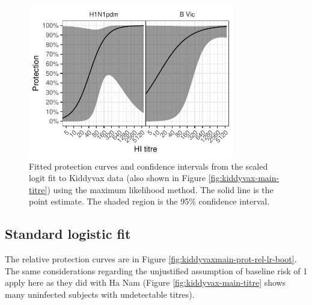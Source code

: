 \documentclass[12pt]{article}
\begin{document}
\begin{figure}[htp]
	\centering
	\includegraphics[width=0.8\textwidth]{../fit-sclr-plot/kiddyvaxmain-prot.pdf}
	\caption{
	Fitted protection curves and confidence intervals from the scaled logit fit to Kiddyvax data (also shown in Figure \ref{fig:kiddyvax-main-titre}) using the maximum likelihood method. The solid line is the point estimate. The shaded region is the 95\% confidence interval.
	}
	\label{fig:kiddyvaxmain-sclr-prot}
\end{figure}

%
\subsection{Standard logistic fit}

The relative protection curves are in Figure \ref{fig:kiddyvaxmain-prot-rel-lr-boot}. The same considerations regarding the unjustified assumption of baseline risk of 1 apply here as they did with Ha Nam (Figure \ref{fig:kiddyvax-main-titre} shows many uninfected subjects with undetectable titres).
\end{document}

